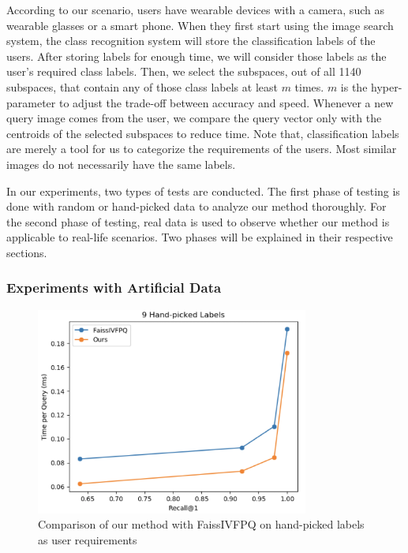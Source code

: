 According to our scenario, users have wearable devices with a camera, such as wearable glasses or a smart phone. 
When they first start using the image search system, the class recognition system will store the classification labels of the users. 
After storing labels for enough time, we will consider those labels as the user's required class labels.
Then, we select the subspaces, out of all 1140 subspaces, that contain any of those class labels at least $m$ times. 
$m$ is the hyper-parameter to adjust the trade-off between accuracy and speed.
Whenever a new query image comes from the user, we compare the query vector only with the centroids of the selected subspaces to reduce time.
Note that, classification labels are merely a tool for us to categorize the requirements of the users.
Most similar images do not necessarily have the same labels.

In our experiments, two types of tests are conducted. 
The first phase of testing is done with random or hand-picked data to analyze our method thoroughly. 
For the second phase of testing, real data is used to observe whether our method is applicable to real-life scenarios. 
Two phases will be explained in their respective sections.

\subsubsection*{Experiments with Artificial Data}

\begin{figure}
    \centering
    \includegraphics[width=0.8\textwidth]{thesis/images/9_handpicked.png}
    \caption{Comparison of our method with FaissIVFPQ on hand-picked labels as user requirements}
    \label{fig:handpickedexp}
\end{figure}

